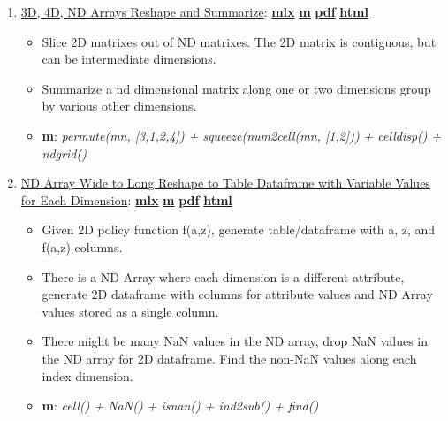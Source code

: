 \documentclass[
]{book}
\providecommand{\tightlist}{%
  \setlength{\itemsep}{0pt}\setlength{\parskip}{0pt}}
\begin{document}
\begin{enumerate}
\def\labelenumi{\arabic{enumi}.}
\tightlist
\item
  \href{https://fanwangecon.github.io/M4Econ/amto/arraynd/htmlpdfm/fs_3d4dndarray.html}{3D, 4D, ND Arrays Reshape and Summarize}: \href{https://github.com/FanWangEcon/M4Econ/blob/master/amto/arraynd/fs_3d4dndarray.mlx}{\textbf{mlx}} \textbar{} \href{https://github.com/FanWangEcon/M4Econ/blob/master/amto/arraynd/htmlpdfm/fs_3d4dndarray.m}{\textbf{m}} \textbar{} \href{https://github.com/FanWangEcon/M4Econ/blob/master/amto/arraynd/htmlpdfm/fs_3d4dndarray.pdf}{\textbf{pdf}} \textbar{} \href{https://fanwangecon.github.io/M4Econ/amto/arraynd/htmlpdfm/fs_3d4dndarray.html}{\textbf{html}}

  \begin{itemize}
  \tightlist
  \item
    Slice 2D matrixes out of ND matrixes. The 2D matrix is contiguous, but can be intermediate dimensions.
  \item
    Summarize a nd dimensional matrix along one or two dimensions group by various other dimensions.
  \item
    \textbf{m}: \emph{permute(mn, {[}3,1,2,4{]}) + squeeze(num2cell(mn, {[}1,2{]})) + celldisp() + ndgrid()}
  \end{itemize}
\item
  \href{https://fanwangecon.github.io/M4Econ/amto/arraynd/htmlpdfm/fs_3d4dndarray_nan.html}{ND Array Wide to Long Reshape to Table Dataframe with Variable Values for Each Dimension}: \href{https://github.com/FanWangEcon/M4Econ/blob/master/amto/arraynd/fs_3d4dndarray_nan.mlx}{\textbf{mlx}} \textbar{} \href{https://github.com/FanWangEcon/M4Econ/blob/master/amto/arraynd/htmlpdfm/fs_3d4dndarray_nan.m}{\textbf{m}} \textbar{} \href{https://github.com/FanWangEcon/M4Econ/blob/master/amto/arraynd/htmlpdfm/fs_3d4dndarray_nan.pdf}{\textbf{pdf}} \textbar{} \href{https://fanwangecon.github.io/M4Econ/amto/arraynd/htmlpdfm/fs_3d4dndarray_nan.html}{\textbf{html}}

  \begin{itemize}
  \tightlist
  \item
    Given 2D policy function f(a,z), generate table/dataframe with a, z, and f(a,z) columns.
  \item
    There is a ND Array where each dimension is a different attribute, generate 2D dataframe with columns for attribute values and ND Array values stored as a single column.
  \item
    There might be many NaN values in the ND array, drop NaN values in the ND array for 2D dataframe. Find the non-NaN values along each index dimension.
  \item
    \textbf{m}: \emph{cell() + NaN() + isnan() + ind2sub() + find()}
  \end{itemize}
\end{enumerate}
\end{document}

